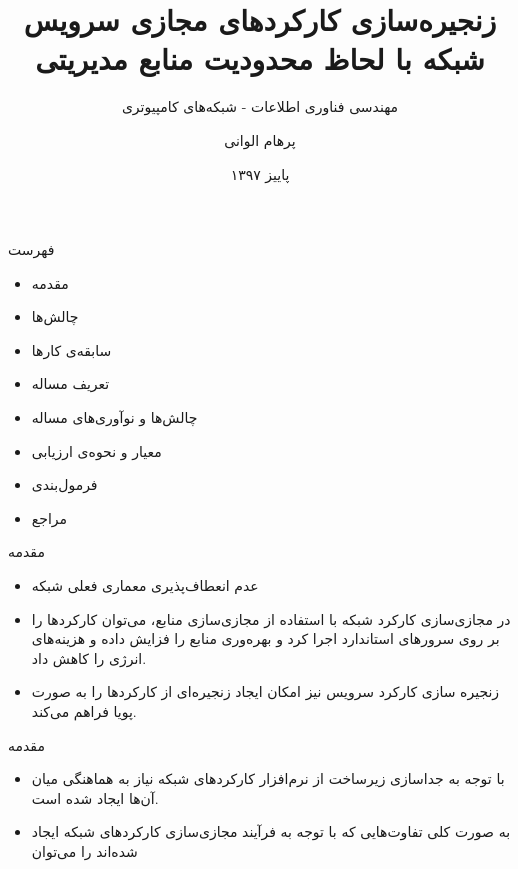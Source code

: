 \documentclass{beamer}
\title{
    زنجیره‌سازی کارکردهای مجازی سرویس شبکه با لحاظ محدودیت منابع مدیریتی
}
\subtitle{مهندسی فناوری اطلاعات - شبکه‌های کامپیوتری}
\author{پرهام الوانی}
\institute{دانشکده مهندسی کامپیوتر و فناوری اطلاعات\\دکتر بهادر بخشی}
\date{پاییز ۱۳۹۷}
\makeatletter
\newcommand{\RTList}{\raggedleft\rightskip\@totalleftmargin}
\makeatother
\begin{document}
\begin{persian}

\begin{frame}
    \titlepage{}
\end{frame}

\everypar{\rightskip\rightmargin}
\begin{frame}{فهرست} %
    \begin{itemize}\RTList{}
        \item مقدمه
        \item چالش‌ها
        \item سابقه‌ی کارها
        \item تعریف مساله
        \item چالش‌ها و نوآوری‌های مساله
        \item معیار و نحوه‌ی ارزیابی
        \item فرمول‌بندی
        \item مراجع
    \end{itemize}
\end{frame}
\begin{frame}{مقدمه} %
    \begin{itemize}\RTList{}
        \item عدم انعطاف‌پذیری معماری فعلی شبکه
        \item در مجازی‌سازی کارکرد شبکه با استفاده از مجازی‌سازی منابع، می‌توان کارکردها را بر روی سرورهای استاندارد اجرا کرد
        و بهره‌وری منابع را فزایش داده و هزینه‌های انرژی را کاهش داد.
        \item زنجیره سازی کارکرد سرویس نیز امکان ایجاد زنجیره‌ای از کارکردها را به صورت پویا فراهم می‌کند.
    \end{itemize}
\end{frame}
\begin{frame}{مقدمه} %
    \begin{itemize}\RTList{}
        \item با توجه به جداسازی زیرساخت از نرم‌افزار کارکردهای شبکه نیاز به هماهنگی میان آن‌ها ایجاد شده است.
        \item به صورت کلی تفاوت‌هایی که با توجه به فرآیند مجازی‌سازی کارکردهای شبکه ایجاد شده‌اند را  می‌توان

\end{itemize}
\end{frame}
\end{persian}
\end{document}
